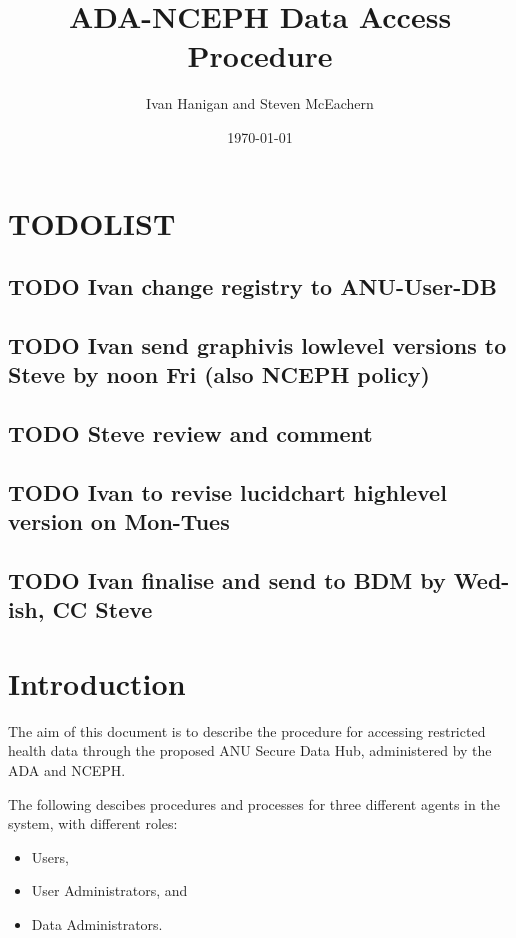 \documentclass[a4paper]{article}
\title{ADA-NCEPH Data Access Procedure}
\author{Ivan Hanigan and Steven McEachern}
\date{\today}
\begin{document}
\maketitle

\tableofcontents

\clearpage
\section{TODOLIST}
\label{sec-1}
\subsection{\textbf{TODO} Ivan change registry to ANU-User-DB}
\label{sec-1-1}
\subsection{\textbf{TODO} Ivan send graphivis lowlevel versions to Steve by noon Fri (also NCEPH policy)}
\label{sec-1-2}
\subsection{\textbf{TODO} Steve review and comment}
\label{sec-1-3}
\subsection{\textbf{TODO} Ivan to revise lucidchart highlevel version on Mon-Tues}
\label{sec-1-4}
\subsection{\textbf{TODO} Ivan finalise and send to BDM by Wed-ish, CC Steve}
\label{sec-1-5}
\section{Introduction}
\label{sec-2}

The aim of this document is to describe the procedure for accessing restricted health data through the proposed ANU Secure Data Hub, administered by the ADA and NCEPH.

The following descibes procedures and processes for three different agents in the system, with different roles:
\begin{itemize}
\item Users,
\item User Administrators, and
\item Data Administrators.
\end{itemize}
\end{document}
